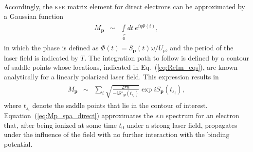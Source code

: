 Accordingly, the \textsc{kfr} matrix element for direct electrons can
be approximated by a Gaussian function~\cite{phd_Kopold}
%
\begin{eqnarray}
  \label{eq:KFR_Mp}
  \begin{split}
    M_{\mathbf{p}} & \sim & \int\limits_{0}\limits^{T} dt\ e^{i \eta \Phi(t)},
  \end{split}
\end{eqnarray}
%
in which the phase is defined as $\Phi(t) = S_{\mathbf{p}}(t)\omega /
U_{p}$, and the period of the laser field is indicated by $T$. The
integration path to follow is defined by a contour of saddle points
whose locations, indicated in Eq.~(\ref{eq:ReIm_eqs}), are known
analytically for a linearly polarized laser field. This expression
results in~\cite{phd_Kopold}
%
\begin{eqnarray}
  \label{eq:Mp_spa_direct}
  \begin{split}
    M_{\mathbf{p}} & \sim & \sum\limits_{i}
    \sqrt{\frac{2\pi\hbar}{-i S''_{\mathbf{p}}(t_{s_{i}})}}
    \exp iS_{\mathbf{p}}(t_{s_{i}}),
  \end{split}
\end{eqnarray}
%
where $t_{s_{i}}$ denote the saddle points that lie in the contour of
interest. Equation~(\ref{eq:Mp_spa_direct}) approximates the
\textsc{ati} spectrum for an electron that, after being ionized at
some time $t_{0}$ under a strong laser field, propagates under the
influence of the field with no further interaction with the binding
potential.


